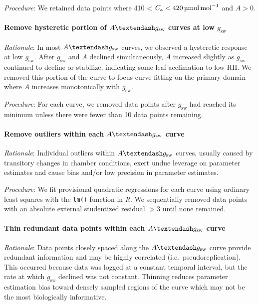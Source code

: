 \documentclass[
  letterpaper,
  DIV=11,
  numbers=noendperiod]{scrartcl}
\let\oldparagraph\paragraph
\renewcommand{\paragraph}[1]{\oldparagraph{#1}\mbox{}}
\newcommand{\agcurve}{$A \textendash g_\text{sw}$}
\newcommand{\cabetween}[2]{#1 < $C_\mathrm{a} < \qty{#2}{\micro\mol\raiseto{-1}\mol}$}
\newcommand{\gsw}{$g_\text{sw}$}
\newcommand{\rh}{$\mathrm{RH}$}
\begin{document}
\emph{Procedure}: We retained data points where \cabetween{410}{420} and
\(A> 0\).

\paragraph{\texorpdfstring{Remove hysteretic portion of \agcurve{}
curves at low
\gsw{}}{Remove hysteretic portion of  curves at low }}\label{remove-hysteretic-portion-of-curves-at-low}

\emph{Rationale}: In most \agcurve{} curves, we observed a hysteretic
response at low \gsw. After \gsw{} and \(A\) declined simultaneously,
\(A\) increased slightly as \gsw{} continued to decline or stabilize,
indicating some leaf acclimation to low \rh. We removed this portion of
the curve to focus curve-fitting on the primary domain where \(A\)
increases monotonically with \gsw{}.

\emph{Procedure}: For each curve, we removed data points after \gsw{}
had reached its minimum unless there were fewer than 10 data points
remaining.

\paragraph{\texorpdfstring{Remove outliers within each \agcurve{}
curve}{Remove outliers within each  curve}}\label{remove-outliers-within-each-curve}

\emph{Rationale}: Individual outliers within \agcurve{} curves, usually
caused by transitory changes in chamber conditions, exert undue leverage
on parameter estimates and cause bias and/or low precision in parameter
estimates.

\emph{Procedure}: We fit provisional quadratic regressions for each
curve using ordinary least squares with the \texttt{lm()} function in
\emph{R}. We sequentially removed data points with an absolute external
studentized residual \(> 3\) until none remained.

\paragraph{\texorpdfstring{Thin redundant data points within each
\agcurve{}
curve}{Thin redundant data points within each  curve}}\label{thin-redundant-data-points-within-each-curve}

\emph{Rationale}: Data points closely spaced along the \agcurve{} curve
provide redundant information and may be highly correlated
(i.e.~pseudoreplication). This occurred because data was logged at a
constant temporal interval, but the rate at which \gsw{} declined was
not constant. Thinning reduces parameter estimation bias toward densely
sampled regions of the curve which may not be the most biologically
informative.
\end{document}
